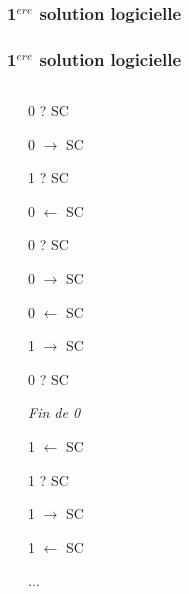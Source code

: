 \begin{frame}
\frametitle{1$^{ere}$ solution logicielle}
\begin{scriptsize}\end{scriptsize}
\end{frame}

\begin{frame}
\frametitle{1$^{ere}$ solution logicielle}
\begin{columns}
\begin{scriptsize}\end{scriptsize}
\begin{itemize}
\begin{scriptsize}
\item 0 ? SC
\item 0 $\rightarrow$ SC
\item 1 ? SC
\item 0 $\leftarrow$ SC
\item 0 ? SC
\item 0 $\rightarrow$ SC
\item 0 $\leftarrow$ SC
\item 1 $\rightarrow$ SC
\item 0 ? SC
\item \textit{Fin de 0}
\item 1 $\leftarrow$ SC
\item 1 ? SC
\item 1 $\rightarrow$ SC
\item 1 $\leftarrow$ SC
\item ...
\end{scriptsize}
\end{itemize}
\end{columns}
\end{frame}

